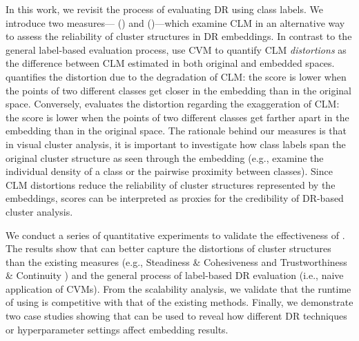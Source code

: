 In this work, we revisit the process of evaluating DR using class labels. 
We introduce two measures---\textit{\LT} (\lt) and \textit{\LC} (\lc)---which examine CLM in an alternative way to assess the reliability of cluster structures in DR embeddings.
In contrast to the general label-based evaluation process, \ltc use CVM to quantify CLM \textit{distortions} as the difference between CLM estimated in both original and embedded spaces. 
\lt quantifies the distortion due to the degradation of CLM: the score is lower when the points of two different classes get closer in the embedding than in the original space. 
Conversely, \lc evaluates the distortion regarding the exaggeration of CLM: the score is lower when the points of two different classes get farther apart in the embedding than in the original space.
The rationale behind our measures is that in visual cluster analysis, it is important to investigate how class labels span the original cluster structure as seen through the embedding \cite{brehmer14beliv, aupetit14beliv, aupetit22arxiv, aupetit22topoinvis, wenskovitch18tvcg} (e.g., examine the individual density of a class or the pairwise proximity between classes). Since CLM distortions reduce the reliability of cluster structures represented by the embeddings, \ltc scores can be interpreted as proxies for the credibility of DR-based cluster analysis. 



We conduct a series of quantitative experiments to validate the effectiveness of \ltc. 
The results show that \ltc can better capture the distortions of cluster structures than the existing measures (e.g., Steadiness \& Cohesiveness \cite{jeon21tvcg} and Trustworthiness  \& Continuity \cite{venna06nn}) and the general process of label-based DR evaluation (i.e., naive application of CVMs).
From the scalability analysis, we validate that the runtime of using \ltc is competitive with that of the existing methods.
Finally, we demonstrate two case studies showing that  \ltc can be used to reveal how different DR techniques or hyperparameter settings affect embedding results. 



